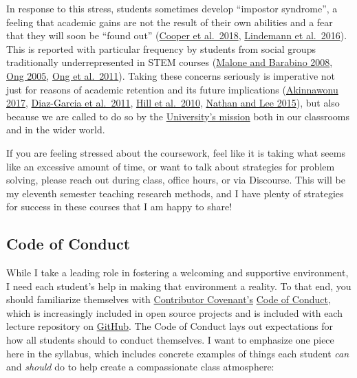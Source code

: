 \documentclass[
]{book}
\begin{document}
In response to this stress, students sometimes develop ``impostor syndrome'', a feeling that academic gains are not the result of their own abilities and a fear that they will soon be ``found out'' (\href{https://www.physiology.org/doi/10.1152/advan.00085.2017}{Cooper et al.~2018}, \href{http://genderandset.open.ac.uk/index.php/genderandset/article/view/435}{Lindemann et al.~2016}). This is reported with particular frequency by students from social groups traditionally underrepresented in STEM courses (\href{https://onlinelibrary.wiley.com/doi/pdf/10.1002/sce.20307}{Malone and Barabino 2008}, \href{https://doi.org/10.1525/sp.2005.52.4.593}{Ong 2005}, \href{https://doi.org/10.17763/haer.81.2.t022245n7x4752v2}{Ong et al.~2011}). Taking these concerns seriously is imperative not just for reasons of academic retention and its future implications (\href{https://open.nytimes.com/why-having-a-diverse-team-will-make-your-products-better-c73e7518f677}{Akinnawonu 2017}, \href{https://www.tandfonline.com/doi/abs/10.5172/impp.2013.15.2.149}{Diaz-Garcia et al.~2011}, \href{https://www.aauw.org/aauw_check/pdf_download/show_pdf.php?file=why-so-few-research}{Hill et al.~2010}, \href{https://www.tandfonline.com/doi/abs/10.1111/ecge.12016}{Nathan and Lee 2015}), but also because we are called to do so by the \href{https://www.slu.edu/about/catholic-jesuit-identity/mission.php}{University's mission} both in our classrooms and in the wider world.

If you are feeling stressed about the coursework, feel like it is taking what seems like an excessive amount of time, or want to talk about strategies for problem solving, please reach out during class, office hours, or via Discourse. This will be my eleventh semester teaching research methods, and I have plenty of strategies for success in these courses that I am happy to share!

\hypertarget{code-of-conduct}{%
\subsection{Code of Conduct}\label{code-of-conduct}}

While I take a leading role in fostering a welcoming and supportive environment, I need each student's help in making that environment a reality. To that end, you should familiarize themselves with \href{https://www.contributor-covenant.org}{Contributor Covenant's} \href{https://www.contributor-covenant.org/version/1/4/code-of-conduct}{Code of Conduct}, which is increasingly included in open source projects and is included with each lecture repository on \href{https://github.com/slu-soc5650}{GitHub}. The Code of Conduct lays out expectations for how all students should to conduct themselves. I want to emphasize one piece here in the syllabus, which includes concrete examples of things each student \emph{can} and \emph{should} do to help create a compassionate class atmosphere:
\end{document}
